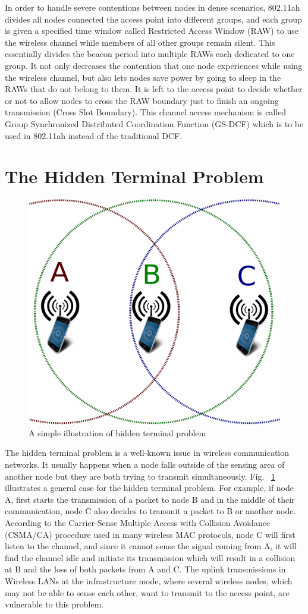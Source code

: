  In order to handle severe contentions between nodes in dense scenarios, 802.11ah divides all nodes connected the access point into different groups, and each group is given a specified time window called Restricted Access Window (RAW) to use the wireless channel while members of all other groups remain silent. This essentially divides the beacon period into multiple RAWs each dedicated to one group. It not only decreases the contention that one node experiences while using the wireless channel, but also lets nodes save power by going to sleep in the RAWs that do not belong to them. It is left to the access point to decide whether or not to allow nodes to cross the RAW boundary just to finish an ongoing transmission (Cross Slot Boundary). This channel access mechanism is called Group Synchronized Distributed Coordination Function (GS-DCF) which is to be used in 802.11ah instead of the traditional DCF.   

\section{The Hidden Terminal Problem}
\begin{figure} [th]
  \centering
  \includegraphics[width=.65\textwidth]{figures/hidden}
  \caption{A simple illustration of hidden terminal problem}
  \label{fig:hidden}
\end{figure}

The hidden terminal problem is a well-known issue in wireless communication networks. It usually happens when a node falls outside of the sensing area of another node but they are both trying to transmit simultaneously. Fig.~ \ref{fig:hidden} illustrates a general case for the hidden terminal problem. For example, if node A, first starts the transmission of a packet to node B and in the middle of their communication, node C also decides to transmit a packet to B or another node. According to the Carrier-Sense Multiple Access with Collision Avoidance (CSMA/CA) procedure used in many wireless MAC protocols, node C will first listen to the channel, and since it cannot sense the signal coming from A, it will find the channel idle and initiate its transmission which will result in a collision at B and the loss of both packets from A and C. The uplink transmissions in Wireless LANs at the infrastructure mode, where several wireless nodes, which may not be able to sense each other, want to transmit to the access point, are vulnerable to this problem. 


